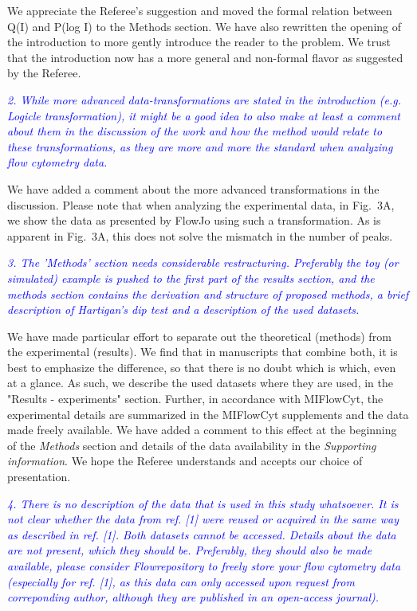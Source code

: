 \documentclass[letter,11pt,draft]{article}
\newcommand{\re}[1]{\emph{\textcolor{blue}{#1}}}
\begin{document}
\smallskip
We appreciate the Referee's suggestion and moved the formal relation between Q(I) and P(log I) to the Methods section. We have also rewritten the opening of the introduction to more gently introduce the reader to the problem. We trust that the introduction now has a more general and non-formal flavor as suggested by the Referee.

\re{2. While more advanced data-transformations are stated in the introduction (e.g. Logicle transformation), it might be a good idea to also make at least a comment about them in the discussion of the work and how the method would relate to these transformations, as they are more and more the standard when analyzing flow cytometry data.}

\smallskip
We have added a comment about the more advanced transformations in the discussion. Please note that when analyzing the experimental data, in Fig.~3A, we show the data as presented by FlowJo using such a transformation. As is apparent in Fig.~3A, this does not solve the mismatch in the number of peaks. 

\re{3. The 'Methods' section needs considerable restructuring. Preferably the toy (or simulated) example is pushed to the first part of the results section, and the methods section contains the derivation and structure of proposed methods, a brief description of Hartigan's dip test and a description of the used datasets.}

\smallskip
We have made particular effort to separate out the theoretical (methods) from the experimental (results). We find that in manuscripts that combine both, it is best to emphasize the difference, so that there is no doubt which is which, even at a glance. As such, we describe the used datasets where they are used, in the "Results - experiments" section. Further, in accordance with MIFlowCyt, the experimental details are summarized in the MIFlowCyt supplements and the data made freely available. We have added a comment to this effect at the beginning of the \emph{Methods} section and details of the data availability in the \emph{Supporting information}. We hope the Referee understands and accepts our choice of presentation.

\re{4. There is no description of the data that is used in this study whatsoever. It is not clear whether the data from ref. [1] were reused or acquired in the same way as described in ref. [1]. Both datasets cannot be accessed. Details about the data are not present, which they should be. Preferably, they should also be made available, please consider Flowrepository to freely store your flow cytometry data (especially for ref. [1], as this data can only accessed upon request from correponding author, although they are published in an open-access journal).}
\end{document}
